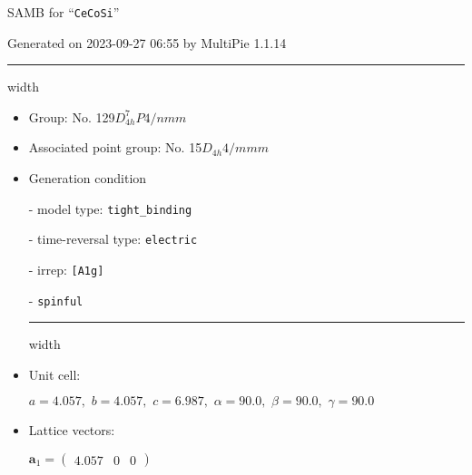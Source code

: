 \documentclass[fleqn,10pt,landscape]{article}
\begin{document}
\setcounter{MaxMatrixCols}{16}

\setlength{\baselineskip}{16pt}
\footnotesize
\begin{center}
\LARGE
SAMB for ``\texttt{CeCoSi}''
\end{center}
\begin{flushright}
Generated on 2023-09-27 06:55 by MultiPie 1.1.14
\end{flushright}
\vspace{1cm}


 \hfil \hrule height 1mm width \textwidth \hfil

\begin{itemize}
\item Group: No. 129\quad$D_{4h}^{7}$\quad$P4/nmm$\quad[ tetragonal ]

\item Associated point group: No. 15\quad$D_{4h}$\quad$4/mmm$\quad[ tetragonal ]

\vspace{5mm}

\item Generation condition

\quad - model type: \texttt{tight_binding}

\quad - time-reversal type: \texttt{electric}

\quad - irrep: \texttt{[A1g]}

\quad - \texttt{spinful}


 \hfil \hrule height 1mm width \textwidth \hfil

\item Unit cell:

\quad $a=4.057,\,\, b=4.057,\,\, c=6.987,\,\, \alpha=90.0,\,\, \beta=90.0,\,\, \gamma=90.0$

\item Lattice vectors:

\quad $\bm{a}_1=\begin{pmatrix} 4.057 & 0 & 0 \end{pmatrix}$


\end{itemize}
\end{document}
